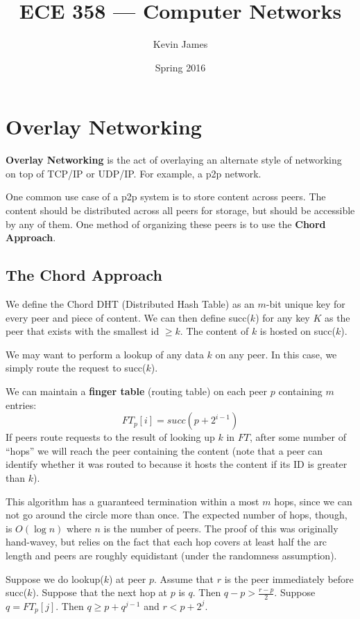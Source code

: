\documentclass[12pt]{article}
\begin{document}
\title{ECE 358 --- Computer Networks}
\author{Kevin James}
\date{\vspace{-2ex}Spring 2016}
\maketitle\HRule

\tableofcontents
\newpage

\section{Overlay Networking}
{\bf Overlay Networking} is the act of overlaying an alternate style of networking on top of TCP/IP or UDP/IP. For example, a p2p network.

One common use case of a p2p system is to store content across peers. The content should be distributed across all peers for storage, but should be accessible by any of them. One method of organizing these peers is to use the {\bf Chord Approach}.

\subsection{The Chord Approach}
We define the Chord DHT (Distributed Hash Table) as an $m$-bit unique key for every peer and piece of content. We can then define succ($k$) for any key $K$ as the peer that exists with the smallest id $\geq k$. The content of $k$ is hosted on succ($k$).

We may want to perform a lookup of any data $k$ on any peer. In this case, we simply route the request to succ($k$).

We can maintain a {\bf finger table} (routing table) on each peer $p$ containing $m$ entries: \[ FT_p[i] = succ(p + 2^{i-1}) \] If peers route requests to the result of looking up $k$ in $FT$, after some number of ``hops'' we will reach the peer containing the content (note that a peer can identify whether it was routed to because it hosts the content if its ID is greater than $k$).

This algorithm has a guaranteed termination within a most $m$ hops, since we can not go around the circle more than once. The expected number of hops, though, is $O(\log n)$ where $n$ is the number of peers. The proof of this was originally hand-wavey, but relies on the fact that each hop covers at least half the arc length and peers are roughly equidistant (under the randomness assumption).

Suppose we do lookup($k$) at peer $p$. Assume that $r$ is the peer immediately before succ($k$). Suppose that the next hop at $p$ is $q$. Then $q - p > \frac{r-p}{2}$. Suppose $q = FT_p[j]$. Then $q \geq p + q^{j-1}$ and $r < p + 2^j$.
\end{document}
